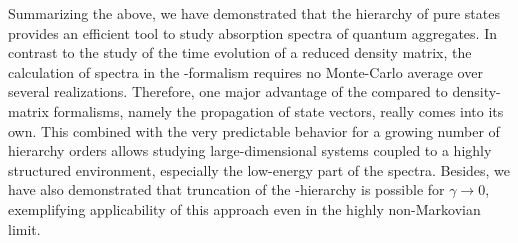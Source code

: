 Summarizing the above, we have demonstrated that the hierarchy of pure states provides an efficient tool to study absorption spectra of quantum aggregates.
In contrast to the study of the time evolution of a reduced density matrix, the calculation of spectra in the \NMSSE-formalism requires no Monte-Carlo average over several realizations.
Therefore, one major advantage of the \NMSSE compared to density-matrix formalisms, namely the propagation of state vectors, really comes into its own.
This combined with the very predictable behavior for a growing number of hierarchy orders allows studying large-dimensional systems coupled to a highly structured environment, especially the low-energy part of the spectra.
Besides, we have also demonstrated that truncation of the \NMSSE-hierarchy is possible for $\gamma \to 0$, exemplifying applicability of this approach even in the highly non-Markovian limit.
